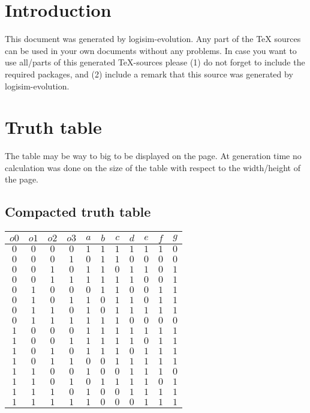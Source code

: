 \documentclass [15pt,a4paper,twoside]{article}
\begin{document}
\section{Introduction}
This document was generated by logisim-evolution. Any part of the TeX sources can be used in your own documents without any problems. In case you want to use all/parts of this generated TeX-sources please (1) do not forget to include the required packages, and (2) include a remark that this source was generated by logisim-evolution.
\section{Truth table}
The table may be way to big to be displayed on the page. At generation time no calculation was done on the size of the table with respect to the width/height of the page.
\subsection{Compacted truth table}
\begin{center}
\begin{tabular}{cccc|ccccccc}
$o0$&$o1$&$o2$&$o3$&$a$&$b$&$c$&$d$&$e$&$f$&$g$\\
\hline
$0$&$0$&$0$&$0$&$1$&$1$&$1$&$1$&$1$&$1$&$0$\\
$0$&$0$&$0$&$1$&$0$&$1$&$1$&$0$&$0$&$0$&$0$\\
$0$&$0$&$1$&$0$&$1$&$1$&$0$&$1$&$1$&$0$&$1$\\
$0$&$0$&$1$&$1$&$1$&$1$&$1$&$1$&$0$&$0$&$1$\\
$0$&$1$&$0$&$0$&$0$&$1$&$1$&$0$&$0$&$1$&$1$\\
$0$&$1$&$0$&$1$&$1$&$0$&$1$&$1$&$0$&$1$&$1$\\
$0$&$1$&$1$&$0$&$1$&$0$&$1$&$1$&$1$&$1$&$1$\\
$0$&$1$&$1$&$1$&$1$&$1$&$1$&$0$&$0$&$0$&$0$\\
$1$&$0$&$0$&$0$&$1$&$1$&$1$&$1$&$1$&$1$&$1$\\
$1$&$0$&$0$&$1$&$1$&$1$&$1$&$1$&$0$&$1$&$1$\\
$1$&$0$&$1$&$0$&$1$&$1$&$1$&$0$&$1$&$1$&$1$\\
$1$&$0$&$1$&$1$&$0$&$0$&$1$&$1$&$1$&$1$&$1$\\
$1$&$1$&$0$&$0$&$1$&$0$&$0$&$1$&$1$&$1$&$0$\\
$1$&$1$&$0$&$1$&$0$&$1$&$1$&$1$&$1$&$0$&$1$\\
$1$&$1$&$1$&$0$&$1$&$0$&$0$&$1$&$1$&$1$&$1$\\
$1$&$1$&$1$&$1$&$1$&$0$&$0$&$0$&$1$&$1$&$1$\\

\end{tabular}
\end{center}
\end{document}
